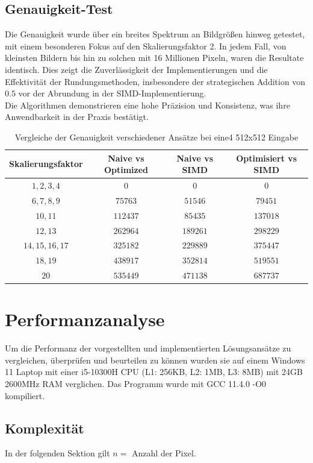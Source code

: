 \documentclass[course=erap]{aspdoc}
\begin{document}
\subsection{Genauigkeit-Test}
Die Genauigkeit wurde über ein breites Spektrum an Bildgrößen hinweg getestet, mit einem besonderen Fokus auf den Skalierungsfaktor 2. In jedem Fall, von kleinsten Bildern bis hin zu solchen mit 16 Millionen Pixeln, waren die Resultate identisch. Dies zeigt die Zuverlässigkeit der Implementierungen und die Effektivität der Rundungsmethoden, insbesondere der strategischen Addition von $0.5$ vor der Abrundung in der SIMD-Implementierung.\\
Die Algorithmen demonstrieren eine hohe Präzision und Konsistenz, was ihre Anwendbarkeit in der Praxis bestätigt.\\


\begin{table}[ht]
\centering
\begin{tabular}{|c|c|c|c|}
\hline
Skalierungsfaktor & Naive vs Optimized & Naive vs SIMD & Optimisiert vs SIMD \\ 
\hline
$1,2,3,4$ & $0$ & $0$ & $0$ \\
$6,7,8,9$ & $75763$ & $51546$ & $79451$ \\
$10,11$ & $112437$ & $85435$ & $137018$ \\
$12,13$ & $262964$ & $189261$ & $298229$ \\
$14,15,16,17$ & $325182$ & $229889$ & $375447$ \\
$18,19$ & $438917$ & $352814$ & $519551$ \\
$20$ & $535449$ & $471138$ & $687737$ \\
\hline
\end{tabular}
\caption{Vergleiche der Genauigkeit verschiedener Ansätze bei eine4 512x512 Eingabe}
\label{table:comparison}
\end{table}

\section{Performanzanalyse}
Um die Performanz der vorgestellten und implementierten Lösungsansätze zu vergleichen, überprüfen und beurteilen zu können wurden sie auf einem Windows 11 Laptop mit einer i5-10300H CPU (L1: 256KB, L2: 1MB, L3: 8MB) mit 24GB 2600MHz RAM verglichen. Das Programm wurde mit GCC 11.4.0 -O0 kompiliert.

\subsection{Komplexität}
In der folgenden Sektion gilt $n =$ Anzahl der Pixel.
\end{document}
